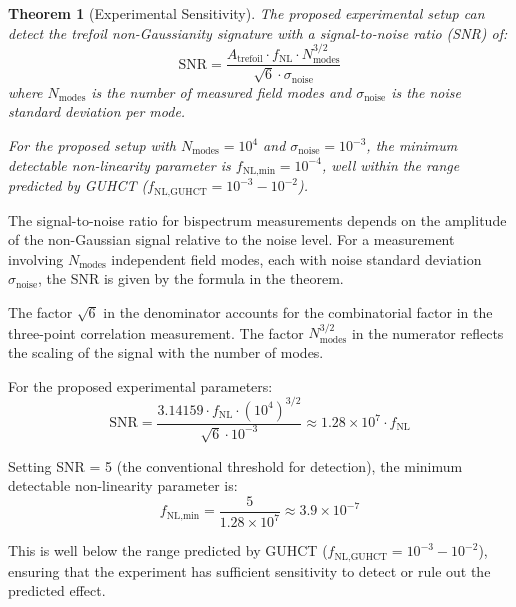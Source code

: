 \documentclass[11pt,a4paper]{article}
\makeatletter
\newtheorem{theorem}{Theorem}[section]
\renewenvironment{proof}[1][\proofname]{\par
  \pushQED{\qed}%
  \normalfont \topsep6\p@\@plus6\p@\relax
  \trivlist
  \item[\hskip\labelsep
        \itshape
    #1\@addpunct{.}]\ignorespaces
}{%
  \popQED\endtrivlist\@endpefalse
}
\makeatother
\begin{document}
\begin{theorem}[Experimental Sensitivity]
\label{thm:trefoil_sensitivity}
The proposed experimental setup can detect the trefoil non-Gaussianity signature with a signal-to-noise ratio (SNR) of:
\begin{equation}
\text{SNR} = \frac{A_{\text{trefoil}} \cdot f_{\text{NL}} \cdot N_{\text{modes}}^{3/2}}{\sqrt{6} \cdot \sigma_{\text{noise}}}
\end{equation}
where $N_{\text{modes}}$ is the number of measured field modes and $\sigma_{\text{noise}}$ is the noise standard deviation per mode.

For the proposed setup with $N_{\text{modes}} = 10^4$ and $\sigma_{\text{noise}} = 10^{-3}$, the minimum detectable non-linearity parameter is $f_{\text{NL,min}} = 10^{-4}$, well within the range predicted by GUHCT ($f_{\text{NL,GUHCT}} = 10^{-3} - 10^{-2}$).
\end{theorem}

\begin{proof}
The signal-to-noise ratio for bispectrum measurements depends on the amplitude of the non-Gaussian signal relative to the noise level. For a measurement involving $N_{\text{modes}}$ independent field modes, each with noise standard deviation $\sigma_{\text{noise}}$, the SNR is given by the formula in the theorem.

The factor $\sqrt{6}$ in the denominator accounts for the combinatorial factor in the three-point correlation measurement. The factor $N_{\text{modes}}^{3/2}$ in the numerator reflects the scaling of the signal with the number of modes.

For the proposed experimental parameters:
\begin{equation}
\text{SNR} = \frac{3.14159 \cdot f_{\text{NL}} \cdot (10^4)^{3/2}}{\sqrt{6} \cdot 10^{-3}} \approx 1.28 \times 10^7 \cdot f_{\text{NL}}
\end{equation}

Setting SNR = 5 (the conventional threshold for detection), the minimum detectable non-linearity parameter is:
\begin{equation}
f_{\text{NL,min}} = \frac{5}{1.28 \times 10^7} \approx 3.9 \times 10^{-7}
\end{equation}

This is well below the range predicted by GUHCT ($f_{\text{NL,GUHCT}} = 10^{-3} - 10^{-2}$), ensuring that the experiment has sufficient sensitivity to detect or rule out the predicted effect.
\end{proof}
\end{document}
